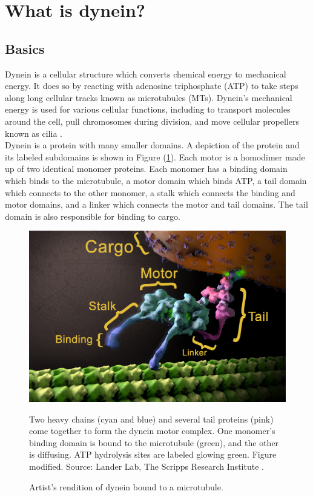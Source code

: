 \documentclass[
11pt, %
english, %
singlespacing, %
headsepline, %
chapterinoneline, %
]{MastersDoctoralThesis} %
\begin{document}


\section{What is dynein?}
\subsection{Basics}
Dynein is a cellular structure which converts chemical energy to mechanical energy. It does so by reacting with adenosine triphosphate (ATP) to take steps along long cellular tracks known as microtubules (MTs). Dynein's mechanical energy is used for various cellular functions, including to transport molecules around the cell, pull chromosomes during division, and move cellular propellers known as cilia \cite{cianfroccoreview}.\\

Dynein is a protein with many smaller domains. A depiction of the protein and its labeled subdomains is shown in Figure (\ref{dynein-artist-rendition}). Each motor is a homodimer made up of two identical monomer proteins. Each monomer has a binding domain which binds to the microtubule, a motor domain which binds ATP, a tail domain which connects to the other monomer, a stalk which connects the binding and motor domains, and a linker which connects the motor and tail domains. The tail domain is also responsible for binding to cargo.\\

\begin{figure}[h]
  \centering
  \includegraphics[width=.65\textwidth,keepaspectratio]{../figures/dynein-artist-rendition.jpg}
  \caption{Artist's rendition of dynein bound to a microtubule.}{Two heavy chains (cyan and blue) and several tail proteins (pink) come together to form the dynein motor complex. One monomer's binding domain is bound to the microtubule (green), and the other is diffusing. ATP hydrolysis sites are labeled glowing green. Figure modified. Source: Lander Lab, The Scripps Research Institute \cite{landerartistsrendition}.}
  \label{dynein-artist-rendition}
\end{figure}
\end{document}
